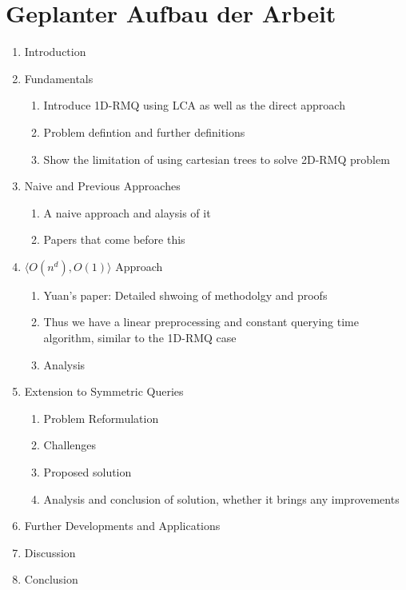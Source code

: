 \documentclass{article}
\begin{document}
\section{Geplanter Aufbau der Arbeit}
\begin{enumerate}
    \item Introduction
    \item Fundamentals 
        \begin{enumerate}
            \item Introduce 1D-RMQ using LCA as well as the direct approach
            \item Problem defintion and further definitions
            \item Show the limitation of using cartesian trees to solve 2D-RMQ problem
        \end{enumerate}
    \item Naive and Previous Approaches
        \begin{enumerate}
        \item A naive approach and alaysis of it
        \item Papers that come before this
        \end{enumerate}
    \item $\langle O(n^d), O(1) \rangle$ Approach
        \begin{enumerate}
            \item Yuan's paper: Detailed shwoing of methodolgy and proofs
            \item Thus we have a linear preprocessing and constant querying time algorithm, similar to the 1D-RMQ case
            \item Analysis
        \end{enumerate}
    \item Extension to Symmetric Queries
        \begin{enumerate}
            \item Problem Reformulation 
            \item Challenges
            \item Proposed solution
            \item Analysis and conclusion of solution, whether it brings any improvements
        \end{enumerate}
    \item Further Developments and Applications
    \item Discussion
    \item Conclusion
\end{enumerate}
\end{document}

